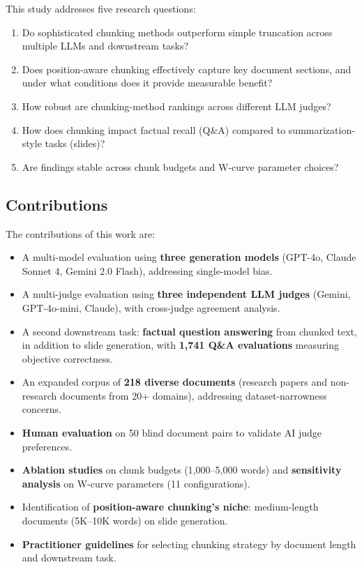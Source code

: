 \documentclass[journal]{IEEEtran}
\begin{document}
This study addresses five research questions:
\begin{enumerate}
    \item Do sophisticated chunking methods outperform simple truncation across multiple LLMs and downstream tasks?
    \item Does position-aware chunking effectively capture key document sections, and under what conditions does it provide measurable benefit?
    \item How robust are chunking-method rankings across different LLM judges?
    \item How does chunking impact factual recall (Q\&A) compared to summarization-style tasks (slides)?
    \item Are findings stable across chunk budgets and W-curve parameter choices?
\end{enumerate}

\subsection{Contributions}

The contributions of this work are:
\begin{itemize}
    \item A multi-model evaluation using \textbf{three generation models} (GPT-4o, Claude Sonnet 4, Gemini 2.0 Flash), addressing single-model bias.
    \item A multi-judge evaluation using \textbf{three independent LLM judges} (Gemini, GPT-4o-mini, Claude), with cross-judge agreement analysis.
    \item A second downstream task: \textbf{factual question answering} from chunked text, in addition to slide generation, with \textbf{1{,}741 Q\&A evaluations} measuring objective correctness.
    \item An expanded corpus of \textbf{218 diverse documents} (research papers and non-research documents from 20+ domains), addressing dataset-narrowness concerns.
    \item \textbf{Human evaluation} on 50 blind document pairs to validate AI judge preferences.
    \item \textbf{Ablation studies} on chunk budgets (1{,}000--5{,}000 words) and \textbf{sensitivity analysis} on W-curve parameters (11 configurations).
    \item Identification of \textbf{position-aware chunking's niche}: medium-length documents (5K--10K words) on slide generation.
    \item \textbf{Practitioner guidelines} for selecting chunking strategy by document length and downstream task.
\end{itemize}
\end{document}
